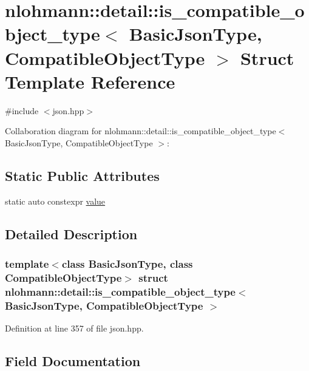 \hypertarget{structnlohmann_1_1detail_1_1is__compatible__object__type}{}\section{nlohmann\+:\+:detail\+:\+:is\+\_\+compatible\+\_\+object\+\_\+type$<$ Basic\+Json\+Type, Compatible\+Object\+Type $>$ Struct Template Reference}
\label{structnlohmann_1_1detail_1_1is__compatible__object__type}


{\ttfamily \#include $<$json.\+hpp$>$}



Collaboration diagram for nlohmann\+:\+:detail\+:\+:is\+\_\+compatible\+\_\+object\+\_\+type$<$ Basic\+Json\+Type, Compatible\+Object\+Type $>$\+:
\subsection*{Static Public Attributes}
\begin{DoxyCompactItemize}
\item 
static auto constexpr \hyperlink{structnlohmann_1_1detail_1_1is__compatible__object__type_a87cce7bcdcd22cc8517f171705f6a7c7}{value}
\end{DoxyCompactItemize}


\subsection{Detailed Description}
\subsubsection*{template$<$class Basic\+Json\+Type, class Compatible\+Object\+Type$>$\newline
struct nlohmann\+::detail\+::is\+\_\+compatible\+\_\+object\+\_\+type$<$ Basic\+Json\+Type, Compatible\+Object\+Type $>$}



Definition at line 357 of file json.\+hpp.



\subsection{Field Documentation}
\mbox{\label{structnlohmann_1_1detail_1_1is__compatible__object__type_a87cce7bcdcd22cc8517f171705f6a7c7}} 
